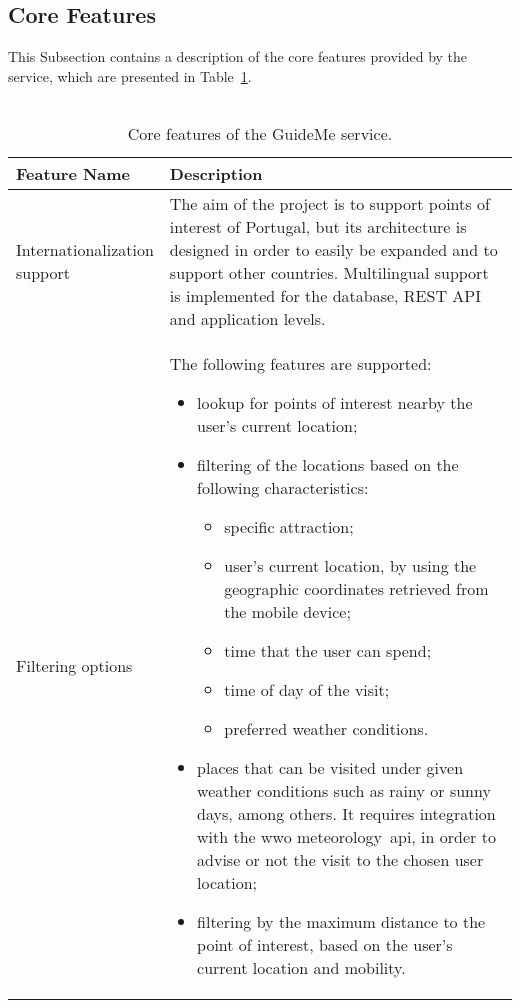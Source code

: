 \subsection{Core Features}
\label{subsec:cf}
This Subsection contains a description of the core features provided by the service, which are presented in Table~\ref{tab:coreFeatures}.\\
\\
\newpage
\begin{center}
    \begin{longtable}{ | p{3.5cm} | p{11.1cm} |}
    \caption{Core features of the GuideMe service.}
    \label{tab:coreFeatures}
	\\
    \hline
    \textbf{Feature Name} & \textbf{Description}\\ \hline
    \hline
    \specialcell[t]{Internationalization\\support} & 
    The aim of the project is to support points of interest of Portugal, but its architecture is designed in order to easily be expanded and to support other countries. Multilingual support is implemented for the database, REST API and application levels. \\ 
    \hline
    
    Filtering options &
    The following features are supported:
	\begin{itemize}
	\item lookup for points of interest nearby the user's current location;
	\item filtering of the locations based on the following characteristics:
	\begin{itemize}
		\item specific attraction;
		\item user's current location, by using the geographic coordinates retrieved from the mobile device;
		\item time that the user can spend;
		\item time of day of the visit;
		\item preferred weather conditions.
	\end{itemize}
	\item places that can be visited under given weather conditions such as rainy or sunny days, among others. It requires integration with the \gls{wwo} meteorology~\gls{api}, in order to advise or not the visit to the chosen user location;
	\item filtering by the maximum distance to the point of interest, based on the user's current location and mobility.
	\end{itemize}
    \\ 
    \hline
    

\end{longtable}
\end{center}

